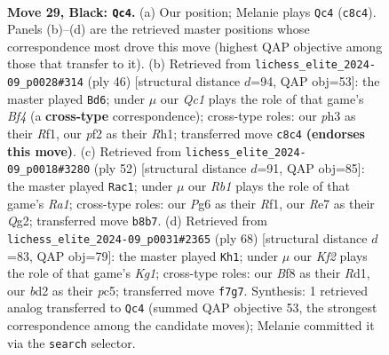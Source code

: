 \documentclass[11pt]{article}
\begin{document}
\clearpage

\begin{figure}[p]\centering
\begin{subfigure}{0.46\textwidth}\centering
\resizebox{\linewidth}{!}{%
\newchessgame
\chessboard[
  setfen={1rq2b2/n3rk2/p2p1pp1/3P3p/Rp2P3/5R1P/3BNPP1/1Q3K2 b - - 1 29},
  showmover=false,
  pgfstyle=straightmove, color=movearrow, markmove={c8-c4}
]}
\caption{}
\end{subfigure}\hfill
\begin{subfigure}{0.46\textwidth}\centering
\resizebox{\linewidth}{!}{%
\newchessgame
\chessboard[
  setfen={r1q2nkr/6p1/2p2bp1/1p1p4/3P1B2/3B2P1/PPQ4P/1K3R1R w - - 2 24},
  showmover=false,
  pgfstyle=straightmove, color=movearrow, markmove={f4-d6}
]}
\caption{}
\end{subfigure}
\\[4pt]
\begin{subfigure}{0.46\textwidth}\centering
\resizebox{\linewidth}{!}{%
\newchessgame
\chessboard[
  setfen={3r3k/p5bp/qp4p1/2pp1r2/2P2P2/3PB3/PP4QP/R4R1K w - - 0 27},
  showmover=false,
  pgfstyle=straightmove, color=movearrow, markmove={a1-c1}
]}
\caption{}
\end{subfigure}\hfill
\begin{subfigure}{0.46\textwidth}\centering
\resizebox{\linewidth}{!}{%
\newchessgame
\chessboard[
  setfen={1B6/p4q1k/1p4np/2p2pb1/2P1p3/1P2P2P/1r4PQ/3R1RK1 w - - 4 35},
  showmover=false,
  pgfstyle=straightmove, color=movearrow, markmove={g1-h1}
]}
\caption{}
\end{subfigure}
\caption{\textbf{Move 29, Black: \texttt{Qc4}.} (a) Our position; Melanie plays \texttt{Qc4} (\texttt{c8c4}). Panels (b)--(d) are the retrieved master positions whose correspondence most drove this move (highest QAP objective among those that transfer to it). (b) Retrieved from \texttt{lichess\_elite\_2024-09\_p0028\#314} (ply 46) [structural distance $d$=94, QAP obj=53]: the master played \texttt{Bd6}; under $\mu$ our \emph{Qc1} plays the role of that game's \emph{Bf4} (a \textbf{cross-type} correspondence); cross-type roles: our \emph{p}h3 as their \emph{R}f1, our \emph{p}f2 as their \emph{R}h1; transferred move \texttt{c8c4} \textbf{(endorses this move)}. (c) Retrieved from \texttt{lichess\_elite\_2024-09\_p0018\#3280} (ply 52) [structural distance $d$=91, QAP obj=85]: the master played \texttt{Rac1}; under $\mu$ our \emph{Rb1} plays the role of that game's \emph{Ra1}; cross-type roles: our \emph{P}g6 as their \emph{R}f1, our \emph{R}e7 as their \emph{Q}g2; transferred move \texttt{b8b7}. (d) Retrieved from \texttt{lichess\_elite\_2024-09\_p0031\#2365} (ply 68) [structural distance $d$=83, QAP obj=79]: the master played \texttt{Kh1}; under $\mu$ our \emph{Kf2} plays the role of that game's \emph{Kg1}; cross-type roles: our \emph{B}f8 as their \emph{R}d1, our \emph{b}d2 as their \emph{p}c5; transferred move \texttt{f7g7}. Synthesis: 1 retrieved analog transferred to \texttt{Qc4} (summed QAP objective 53, the strongest correspondence among the candidate moves); Melanie committed it via the \texttt{search} selector.}
\label{fig:thought-m57}
\end{figure}
\end{document}
